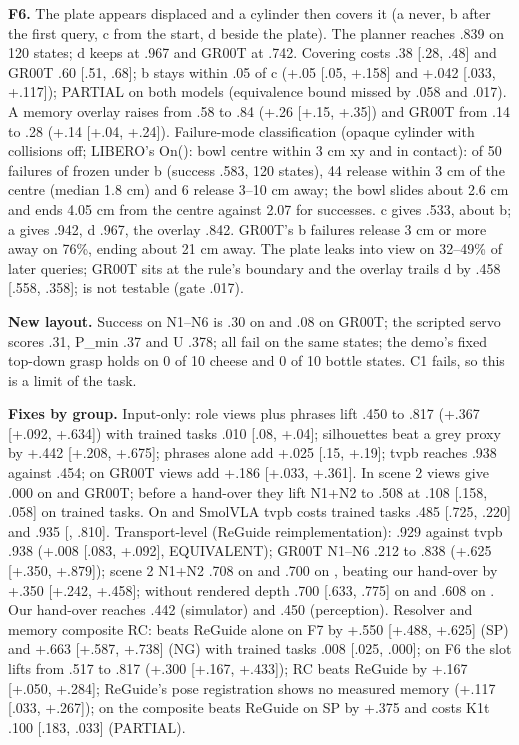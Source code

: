 \textbf{F6.} The plate appears displaced and a cylinder then covers it (a never, b after the first query, c from the start, d beside the plate). The planner reaches .839 on 120 states; d keeps \pifive{} at .967 and GR00T at .742. Covering costs \pifive{} .38 [.28, .48] and GR00T .60 [.51, .68]; b stays within .05 of c (+.05 [\mi.05, +.158] and +.042 [\mi.033, +.117]); PARTIAL on both models (equivalence bound missed by .058 and .017). A memory overlay raises \pifive{} from .58 to .84 (+.26 [+.15, +.35]) and GR00T from .14 to .28 (+.14 [+.04, +.24]). Failure-mode classification (opaque cylinder with collisions off; LIBERO's On(): bowl centre within 3 cm xy and in contact): of 50 failures of frozen \pifive{} under b (success .583, 120 states), 44 release within 3 cm of the centre (median 1.8 cm) and 6 release 3--10 cm away; the bowl slides about 2.6 cm and ends 4.05 cm from the centre against 2.07 for successes. c gives .533, about b; a gives .942, d .967, the overlay .842. GR00T's b failures release 3 cm or more away on 76\%, ending about 21 cm away. The plate leaks into view on 32--49\% of later queries; GR00T sits at the rule's boundary and the overlay trails d by \mi.458 [\mi.558, \mi.358]; \pizero{} is not testable (gate .017).

\textbf{New layout.} Success on N1--N6 is .30 on \pifive{} and .08 on GR00T; the scripted servo scores .31, P\_min .37 and U .378; all fail on the same states; the demo's fixed top-down grasp holds on 0 of 10 cheese and 0 of 10 bottle states. C1 fails, so this is a limit of the task.

\textbf{Fixes by group.} Input-only: role views plus phrases lift \pifive{} .450 to .817 (+.367 [+.092, +.634]) with trained tasks \mi.010 [\mi.08, +.04]; silhouettes beat a grey proxy by +.442 [+.208, +.675]; phrases alone add +.025 [\mi.15, +.19]; tvpb reaches .938 against .454; on GR00T views add +.186 [+.033, +.361]. In scene 2 views give .000 on \pifive{} and GR00T; before a hand-over they lift N1+N2 to .508 at \mi.108 [\mi.158, \mi.058] on trained tasks. On \pizero{} and SmolVLA tvpb costs trained tasks \mi.485 [\mi.725, \mi.220] and \mi.935 [, \mi.810]. Transport-level (ReGuide reimplementation): \pifive{} .929 against tvpb .938 (+.008 [\mi.083, +.092], EQUIVALENT); GR00T N1--N6 .212 to .838 (+.625 [+.350, +.879]); scene 2 N1+N2 .708 on \pifive{} and .700 on \pizero, beating our hand-over by +.350 [+.242, +.458]; without rendered depth .700 [.633, .775] on \pifive{} and .608 on \pizero. Our hand-over reaches .442 (simulator) and .450 (perception). Resolver and memory composite RC: beats ReGuide alone on F7 by +.550 [+.488, +.625] (SP) and +.663 [+.587, +.738] (NG) with trained tasks \mi.008 [\mi.025, .000]; on F6 the slot lifts \pifive{} from .517 to .817 (+.300 [+.167, +.433]); RC beats ReGuide by +.167 [+.050, +.284]; ReGuide's pose registration shows no measured memory (+.117 [\mi.033, +.267]); on \pizero{} the composite beats ReGuide on SP by +.375 and costs K1t \mi.100 [\mi.183, \mi.033] (PARTIAL).

